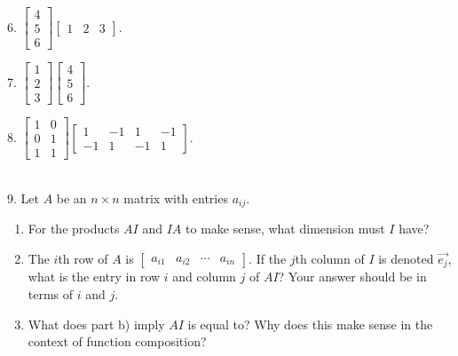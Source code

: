 \documentclass{article}
\begin{document}
6. $\displaystyle \left[\begin{array}{c}4 \\ 5 \\ 6\end{array}\right]\left[\begin{array}{ccc}1& 2& 3\end{array}\right].$

7. $\displaystyle \left[\begin{array}{c}1 \\ 2 \\ 3\end{array}\right]\left[\begin{array}{c}4 \\ 5 \\ 6\end{array}\right].$

8. $\displaystyle \left[\begin{array}{cc}1& 0 \\ 0& 1 \\ 1& 1\end{array}\right]\left[\begin{array}{cccc}1& -1& 1& -1 \\ -1& 1& -1& 1\end{array}\right].$

~\\

9. Let $A$ be an $n \times n$ matrix with entries $a_{ij}$.

\begin{enumerate}

	\item For the products $AI$ and $IA$ to make sense, what dimension must $I$ have?

	\item The $i$th row of $A$ is $\left[\begin{array}{cccc}a_{i1}& a_{i2}& \cdots& a_{in}\end{array}\right]$. If the $j$th column of $I$ is denoted $\vec{e_j}$, what is the entry in row $i$ and column $j$ of $AI$? Your answer should be in terms of $i$ and $j$.

	\item What does part b) imply $AI$ is equal to? Why does this make sense in the context of function composition?

\end{enumerate}

~\\
\end{document}

